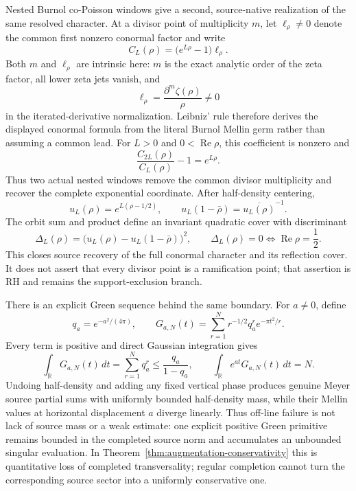 \documentclass[11pt]{article}
\theoremstyle{definition}
\theoremstyle{remark}
\newcommand{\R}{\mathbb R}
\newcommand{\Rea}{\operatorname{Re}}
\begin{document}
Nested Burnol co-Poisson windows give a second, source-native realization of
the same resolved character.  At a divisor point of multiplicity \(m\), let
\(\ell_\rho\ne0\) denote the common first nonzero conormal factor and write
\[
 C_L(\rho)=\bigl(e^{L\rho}-1\bigr)\ell_\rho .
\]
Both \(m\) and \(\ell_\rho\) are intrinsic here: \(m\) is the exact analytic
order of the zeta factor, all lower zeta jets vanish, and
\[
 \ell_\rho=
 \frac{\partial^m\zeta(\rho)}{\rho}\ne0
\]
in the iterated-derivative normalization.  Leibniz' rule therefore derives
the displayed conormal formula from the literal Burnol Mellin germ rather
than assuming a common lead.
For \(L>0\) and \(0<\Rea\rho\), this coefficient is nonzero and
\[
              \frac{C_{2L}(\rho)}{C_L(\rho)}-1=e^{L\rho}.
\tag{7.6Y}\label{eq:burnol-doubled-window-character}
\]
Thus two actual nested windows remove the common divisor multiplicity and
recover the complete exponential coordinate.  After half-density centering,
\[
 u_L(\rho)=e^{L(\rho-1/2)},\qquad
 u_L(1-\bar\rho)=\overline{u_L(\rho)}^{-1}.
\]
The orbit sum and product define an invariant quadratic cover with
discriminant
\[
 \Delta_L(\rho)
 =\bigl(u_L(\rho)-u_L(1-\bar\rho)\bigr)^2,\qquad
 \Delta_L(\rho)=0\Longleftrightarrow\Rea\rho=\frac12.
\tag{7.6Z}\label{eq:burnol-conormal-cover-discriminant}
\]
This closes source recovery of the full conormal character and its reflection
cover.  It does not assert that every divisor point is a ramification point;
that assertion is RH and remains the support-exclusion branch.

There is an explicit Green sequence behind the same boundary.  For
\(a\ne0\), define
\[
 q_a=e^{-a^2/(4\pi)},\qquad
 G_{a,N}(t)=\sum_{r=1}^{N}r^{-1/2}q_a^r e^{-\pi t^2/r}.
\tag{7.6a}\label{eq:gaussian-green-partial}
\]
Every term is positive and direct Gaussian integration gives
\[
 \int_\R G_{a,N}(t)\,dt=\sum_{r=1}^{N}q_a^r
 \le \frac{q_a}{1-q_a},
 \qquad
 \int_\R e^{at}G_{a,N}(t)\,dt=N.
\tag{7.6b}\label{eq:gaussian-green-defect}
\]
Undoing half-density and adding any fixed vertical phase produces genuine
Meyer source partial sums with uniformly bounded half-density mass, while
their Mellin values at horizontal displacement \(a\) diverge linearly.
Thus off-line failure is not lack of source mass or a weak estimate: one
explicit positive Green primitive remains bounded in the completed source
norm and accumulates an unbounded singular evaluation.  In
Theorem~\ref{thm:augmentation-conservativity} this is quantitative loss of
completed transversality; regular completion cannot turn the corresponding
source sector into a uniformly conservative one.
\end{document}
